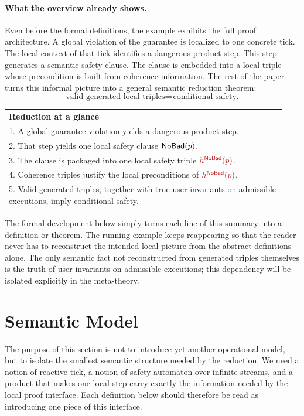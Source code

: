 \documentclass[acmsmall,screen]{acmart}
\theoremstyle{leftplain}
\theoremstyle{leftdefinition}
\theoremstyle{leftremark}
\begin{document}
\paragraph{What the overview already shows.}
Even before the formal definitions, the example exhibits the full proof
architecture. A global violation of the guarantee is localized to one concrete
tick. The local context of that tick identifies a dangerous product step. This
step generates a semantic safety clause. The clause is embedded into a local
triple whose precondition is built from coherence information. The rest of the
paper turns this informal picture into a general semantic reduction theorem:
\[
  \text{valid generated local triples}
  \Longrightarrow
  \text{conditional safety.}
\]

\begin{center}
\begin{tabular}{@{}p{0.94\linewidth}@{}}
\textbf{Reduction at a glance} \\
1. A global guarantee violation yields a dangerous product step. \\
2. That step yields one local safety clause $\mathsf{NoBad}(p)$. \\
3. The clause is packaged into one local safety triple $\triplesafe{h^{\NoBad}(p)}$. \\
4. Coherence triples justify the local preconditions of $\triplesafe{h^{\NoBad}(p)}$. \\
5. Valid generated triples, together with true user invariants on admissible executions, imply conditional safety. \\
\end{tabular}
\end{center}

The formal development below simply turns each line of this summary into a
definition or theorem. The running example keeps reappearing so that the reader
never has to reconstruct the intended local picture from the abstract
definitions alone. The only semantic fact not reconstructed from generated
triples themselves is the truth of user invariants on admissible executions; this
dependency will be isolated explicitly in the meta-theory.

\section{Semantic Model}\label{sec:model}

The purpose of this section is not to introduce yet another operational model,
but to isolate the smallest semantic structure needed by the reduction. We
need a notion of reactive tick, a notion of safety automaton over infinite
streams, and a product that makes one local step carry exactly the information
needed by the local proof interface. Each definition below should therefore be
read as introducing one piece of this interface.
\end{document}
